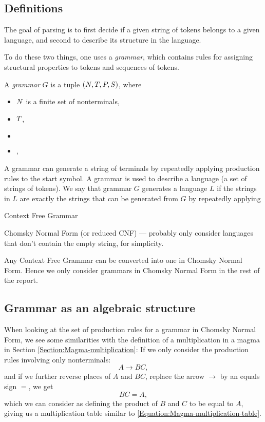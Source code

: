 \documentclass{article}
\begin{document}
\subsection{Definitions}
The goal of parsing is to first decide if a given string of tokens belongs to a given language, and second to describe its structure in the language.

To do these two things, one uses a \emph{grammar}, which contains rules for assigning structural properties to tokens and sequences of tokens.

\begin{Definition}
  A \emph{grammar} $G$ is a tuple $(N, T, P, S)$, where 
  \begin{itemize}
  \item $N$ is a finite set of nonterminals, 
  \item $T$,
  \item $ $
  \item $ $,
  \end{itemize}
\end{Definition}
A grammar can generate a string of terminals by repeatedly applying production rules to the start symbol. 
A grammar is used to describe a language (a set of strings of tokens). We say that  grammar $G$ generates a language $L$ if the strings in $L$ are exactly the strings that can be generated from $G$ by repeatedly applying 

\begin{Definition}
  Context Free Grammar
\end{Definition}
\begin{Definition}
  Chomsky Normal Form (or reduced CNF) --- probably only consider languages that don't contain the empty string, for simplicity.
\end{Definition}
Any Context Free Grammar can be converted into one in Chomsky Normal Form. Hence we only consider grammars in Chomsky Normal Form in the rest of the report.

\subsection{Grammar as an algebraic structure}
When looking at the set of production rules for a grammar in Chomsky Normal Form, we see some similarities with the definition of a multiplication in a magma in Section \ref{Section:Magma-multiplication}:
If we only consider the production rules involving only nonterminals:
\begin{equation*}
  A \to BC,
\end{equation*}
and if we further reverse places of $A$ and $BC$, replace the arrow $\to$ by an equals sign $=$, we get
\begin{equation*}
  BC = A,
\end{equation*}
which we can consider as defining the product of $B$ and $C$ to be equal to $A$, giving us a multiplication table similar to \eqref{Equation:Magma-multiplication-table}.
\end{document}
